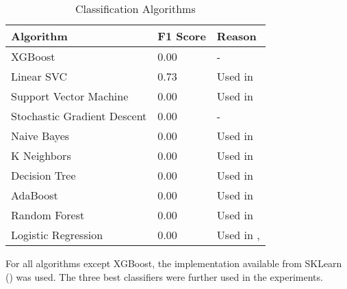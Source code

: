 \begin{table}[h]
\centering
\label{tbl:algo}
\caption{Classification Algorithms}
\begin{tabularx}{\textwidth}{XlX}
\toprule
Algorithm & F1 Score & Reason\\ \midrule

XGBoost & 0.00 & -\\  

Linear SVC & 0.73 & Used in \cite{Aker2017What-works-and-}\\  

Support Vector Machine & 0.00 & Used in \cite{Stab2014Identifying-Arg,Eckle-Kohler2015On-the-Role-of-,Park:2012:ICC:2391171.2391173,Lippi2016Argumentation-M,Habernal2016Argumentation-M}\\ 

Stochastic Gradient Descent & 0.00 & -\\ 

Naive Bayes & 0.00 & Used in \cite{Stab2014Identifying-Arg,Eckle-Kohler2015On-the-Role-of-,Aker2017What-works-and-,Park:2012:ICC:2391171.2391173,Lippi2016Argumentation-M}\\  

K Neighbors & 0.00 & Used in \cite{Aker2017What-works-and-}\\ 

Decision Tree & 0.00 & Used in \cite{Stab2014Identifying-Arg,Lippi2016Argumentation-M}\\ 

AdaBoost & 0.00 & Used in \cite{Aker2017What-works-and-}\\  

Random Forest & 0.00 & Used in \cite{Dusmanu2017Argument-Mining,Stab2014Identifying-Arg,Eckle-Kohler2015On-the-Role-of-,Aker2017What-works-and-,Lippi2016Argumentation-M}\\  

Logistic Regression & 0.00 & Used in \cite{Dusmanu2017Argument-Mining,Daxenberger2017What-is-the-EssAker2017What-works-and-}, \cite{Lippi2016Argumentation-M}\\ \bottomrule 
\end{tabularx}

\end{table}


For all algorithms except XGBoost, the implementation available from SKLearn (\cite{scikit-learn}) was used. The three best classifiers were further used in the experiments.









